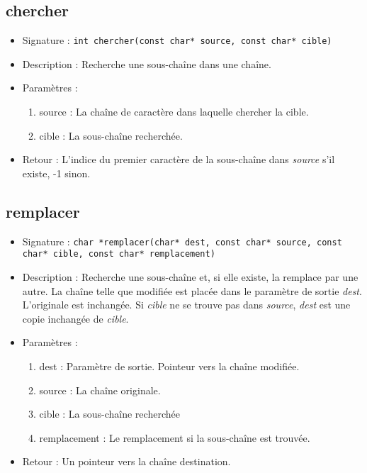 \documentclass[12pt,pdftex,oneside]{article}
\begin{document}
\subsection{chercher}
\begin{itemize}
\item Signature : \texttt{int chercher(const char* source, const char* cible)}
\item Description : Recherche une sous-chaîne dans une chaîne.
\item Paramètres :
  \begin{enumerate}
  \item source : La chaîne de caractère dans laquelle chercher la cible.
  \item cible : La sous-chaîne recherchée.
  \end{enumerate}
\item Retour : L'indice du premier caractère de la sous-chaîne dans \emph{source} s'il existe, -1 sinon.
\end{itemize}

\subsection{remplacer}
\begin{itemize}
\item Signature : \texttt{char *remplacer(char* dest, const char* source, const char* cible, const char* remplacement)}
\item Description : Recherche une sous-chaîne et, si elle existe, la remplace par une autre. La chaîne telle que modifiée est placée dans le paramètre de sortie \emph{dest}. L'originale est inchangée. Si \emph{cible} ne se trouve pas dans \emph{source}, \emph{dest} est une copie inchangée de \emph{cible}.
\item Paramètres :
  \begin{enumerate}
  \item dest : Paramètre de sortie. Pointeur vers la chaîne modifiée.
  \item source : La chaîne originale.
  \item cible : La sous-chaîne recherchée
    \item remplacement : Le remplacement si la sous-chaîne est trouvée.
    \end{enumerate}

  \item Retour : Un pointeur vers la chaîne destination.
  \end{itemize}
  
\end{document}
